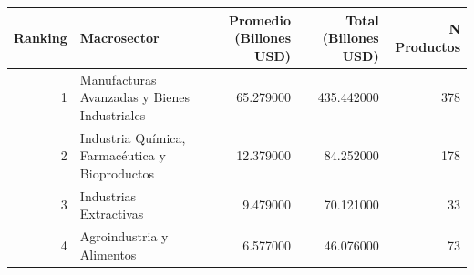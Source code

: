 \begin{tabular}{rlrrr}
\toprule
Ranking & Macrosector & Promedio (Billones USD) & Total (Billones USD) & N Productos \\
\midrule
1 & Manufacturas Avanzadas y Bienes Industriales & 65.279000 & 435.442000 & 378 \\
2 & Industria Química, Farmacéutica y Bioproductos & 12.379000 & 84.252000 & 178 \\
3 & Industrias Extractivas & 9.479000 & 70.121000 & 33 \\
4 & Agroindustria y Alimentos & 6.577000 & 46.076000 & 73 \\
\bottomrule
\end{tabular}
